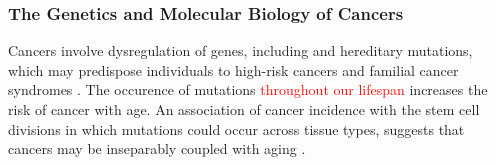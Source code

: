 

\subsubsection{The Genetics and Molecular Biology of Cancers}

Cancers involve dysregulation of genes, including  and \gls{hereditary} \glspl{mutation}, which may predispose individuals to high-risk cancers and \gls{familial} cancer syndromes \citep{NCI2015, ACS2017, Guilford1998, Stratton2009, Vogelstein2013}. 
The occurence of  \glspl{mutation} \textcolor{red}{throughout our lifespan} increases the risk of \gls{cancer} with age. An association of cancer incidence with the stem cell divisions in which \glspl{mutation} could occur across tissue types, suggests that cancers may be inseparably coupled with aging \citep{Tomasetti2015}.  



